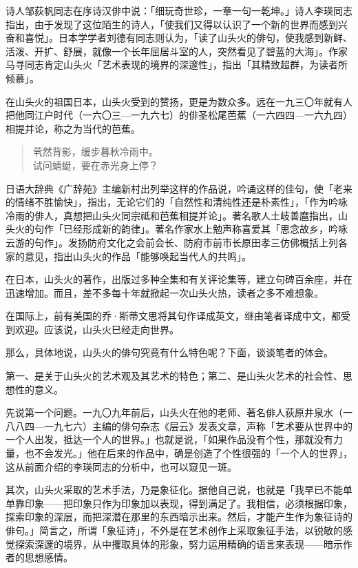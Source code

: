 {诗人邹荻帆同志在序诗汉俳中说：「细玩奇世珍，一章一句一乾坤。」诗人李瑛同志指出，由于发现了这位陌生的诗人，「使我们又得以认识了一个新的世界而感到兴奋和喜悦」。日本学学者刘德有同志则认为，「读了山头火的俳句，使我感到新鲜、活泼、开扩、舒展，就像一个长年屈居斗室的人，突然看见了碧蓝的大海」。作家马寻同志肯定山头火「艺术表现的境界的深邃性」，指出「其精致超群，为读者所倾慕」。

在山头火的祖国日本，山头火受到的赞扬，更是为数众多。远在一九三〇年就有人把他同江户时代（一六〇三—一九六七）的俳圣松尾芭蕉（一六四四—一六九四）相提并论，称之为当代的芭蕉。
\begin{quote}
    茕然背影，缓步暮秋冷雨中。\\
    试问蜻蜓，要在赤光身上停？
\end{quote}

日语大辞典《广辞苑》主编新村出列举这样的作品说，吟诵这样的佳句，使「老来的情绪不胜愉快」，指出，无论它们的「自然性和清纯性还是朴素性」，「作为吟咏冷雨的俳人，真想把山头火同宗祗\footnotemark[1] 和芭蕉相提并论」。著名歌人土岐善麿指出，山头火的句作「已经形成新的韵律」。著名作家水上勉声称喜爱其「思念故乡，吟咏云游的句作」。发扬防府文化之会前会长、防府市前市长原田孝三仿佛概括上列各家的意见，指出山头火的作品「能够唤起当代人的共鸣」。


在日本，山头火的著作，出版过多种全集和有关评论集等，建立句碑百余座，并在迅速增加。而且，差不多每十年就掀起一次山头火热，读者之多不难想象。

在国际上，前有美国的乔·斯蒂文思将其句作译成英文，继由笔者译成中文，都受到欢迎。应该说，山头火巳经走向世界。

那么，具体地说，山头火的俳句究竟有什么特色呢？下面，谈谈笔者的体会。

第一、是关于山头火的艺术观及其艺术的特色；第二、是山头火艺术的社会性、思想性的意义。

先说第一个问题。一九〇九年前后，山头火在他的老师、著名俳人荻原井泉水（一八八四—一九七六）主编的俳句杂志《层云》发表文章，声称「艺术要从世界中的一个人出发，抵达一个人的世界。」\footnotemark[2] 也就是说，「如果作品没有个性，那就没有力量，也不会发光。」\footnotemark[3] 他在后来的作品中，确是创造了个性很强的「一个人的世界」，这从前面介绍的李瑛同志的分析中，也可以窥见一斑。


其次，山头火采取的艺术手法，乃是象征化。据他自己说，也就是「我早已不能单单靠印象——把印象只作为印象加以表现，得到满足了。我相信，必须根据印象，探索印象的深层，而把深潜在那里的东西暗示出来。然后，才能产生作为象征诗的俳句。」\footnotemark[4] 简言之，所谓「象征诗」，不外是在艺术创作上采取象征手法，以锐敏的感觉探索深邃的境界，从中攫取具体的形象，努力运用精确的语言来表现——暗示作者的思想感情。

}
